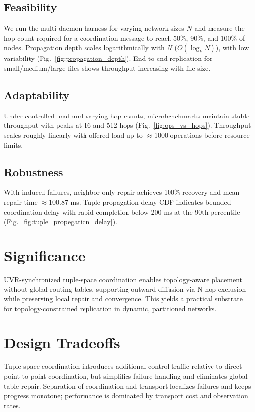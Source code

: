 \documentclass[runningheads]{llncs}
\begin{document}
\subsection{Feasibility}
We run the multi-daemon harness for varying network sizes $N$ and measure the hop count required for a coordination message to reach 50\%, 90\%, and 100\% of nodes. Propagation depth scales logarithmically with $N$ ($O(\log_k N)$), with low variability (Fig.~\ref{fig:propagation_depth}). End-to-end replication for small/medium/large files shows throughput increasing with file size.

\subsection{Adaptability}
Under controlled load and varying hop counts, microbenchmarks maintain stable throughput with peaks at 16 and 512 hops (Fig.~\ref{fig:ops_vs_hops}). Throughput scales roughly linearly with offered load up to $\approx$1000 operations before resource limits.

\subsection{Robustness}
With induced failures, neighbor-only repair achieves 100\% recovery and mean repair time $\approx$100.87 ms. Tuple propagation delay CDF indicates bounded coordination delay with rapid completion below 200 ms at the 90th percentile (Fig.~\ref{fig:tuple_propegation_delay}).

\section{Significance}
UVR-synchronized tuple-space coordination enables topology-aware placement without global routing tables, supporting outward diffusion via N-hop exclusion while preserving local repair and convergence. This yields a practical substrate for topology-constrained replication in dynamic, partitioned networks.

\section{Design Tradeoffs}
Tuple-space coordination introduces additional control traffic relative to direct point-to-point coordination, but simplifies failure handling and eliminates global table repair. Separation of coordination and transport localizes failures and keeps progress monotone; performance is dominated by transport cost and observation rates.
\end{document}

